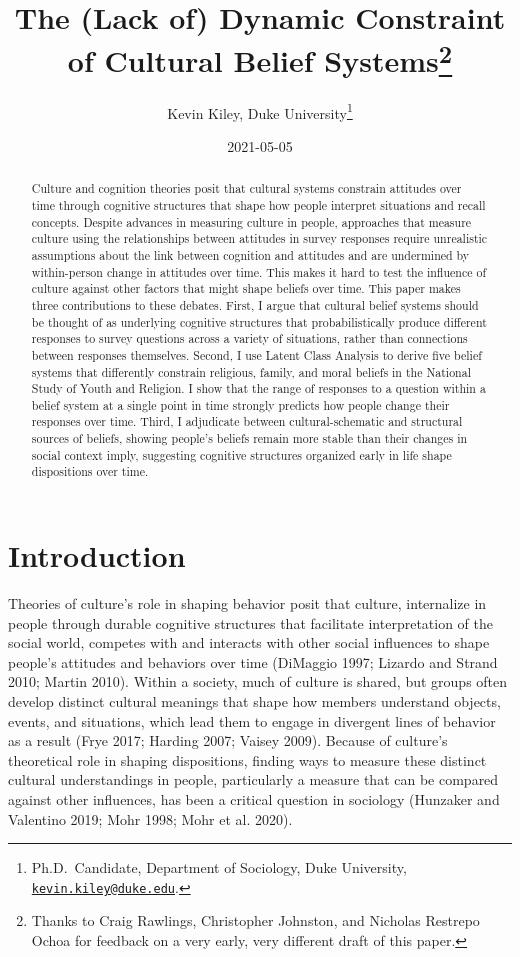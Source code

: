 \documentclass[12pt,]{article}
\title{The (Lack of) Dynamic Constraint of Cultural Belief Systems\footnote{Thanks to Craig Rawlings, Christopher Johnston, and Nicholas Restrepo Ochoa for feedback on a very early, very different draft of this paper.}}
\author{Kevin Kiley, Duke University\footnote{Ph.D.~Candidate, Department of Sociology, Duke University, \href{mailto:kevin.kiley@duke.edu}{\nolinkurl{kevin.kiley@duke.edu}}.}}
\date{2021-05-05}
\begin{document}
\maketitle
\begin{abstract}
Culture and cognition theories posit that cultural systems constrain attitudes over time through cognitive structures that shape how people interpret situations and recall concepts. Despite advances in measuring culture in people, approaches that measure culture using the relationships between attitudes in survey responses require unrealistic assumptions about the link between cognition and attitudes and are undermined by within-person change in attitudes over time. This makes it hard to test the influence of culture against other factors that might shape beliefs over time. This paper makes three contributions to these debates. First, I argue that cultural belief systems should be thought of as underlying cognitive structures that probabilistically produce different responses to survey questions across a variety of situations, rather than connections between responses themselves. Second, I use Latent Class Analysis to derive five belief systems that differently constrain religious, family, and moral beliefs in the National Study of Youth and Religion. I show that the range of responses to a question within a belief system at a single point in time strongly predicts how people change their responses over time. Third, I adjudicate between cultural-schematic and structural sources of beliefs, showing people's beliefs remain more stable than their changes in social context imply, suggesting cognitive structures organized early in life shape dispositions over time.
\end{abstract}

\doublespacing

\hypertarget{introduction}{%
\section{Introduction}\label{introduction}}

Theories of culture's role in shaping behavior posit that culture, internalize in people through durable cognitive structures that facilitate interpretation of the social world, competes with and interacts with other social influences to shape people's attitudes and behaviors over time (DiMaggio 1997; Lizardo and Strand 2010; Martin 2010). Within a society, much of culture is shared, but groups often develop distinct cultural meanings that shape how members understand objects, events, and situations, which lead them to engage in divergent lines of behavior as a result (Frye 2017; Harding 2007; Vaisey 2009). Because of culture's theoretical role in shaping dispositions, finding ways to measure these distinct cultural understandings in people, particularly a measure that can be compared against other influences, has been a critical question in sociology (Hunzaker and Valentino 2019; Mohr 1998; Mohr et al. 2020).
\end{document}
